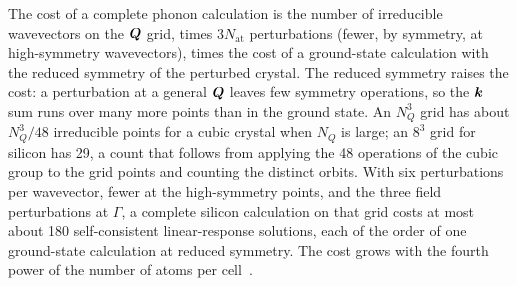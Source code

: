The cost of a complete phonon calculation is the number of irreducible wavevectors on the $\bm{Q}$ grid, times $3N_{\mathrm{at}}$ perturbations (fewer, by symmetry, at high-symmetry wavevectors), times the cost of a ground-state calculation with the reduced symmetry of the perturbed crystal. The reduced symmetry raises the cost: a perturbation at a general $\bm{Q}$ leaves few symmetry operations, so the $\bm{k}$ sum runs over many more points than in the ground state. An $N_Q^3$ grid has about $N_Q^3/48$ irreducible points for a cubic crystal when $N_Q$ is large; an $8^3$ grid for silicon has 29, a count that follows from applying the 48 operations of the cubic group to the grid points and counting the distinct orbits. With six perturbations per wavevector, fewer at the high-symmetry points, and the three field perturbations at $\Gamma$, a complete silicon calculation on that grid costs at most about 180 self-consistent linear-response solutions, each of the order of one ground-state calculation at reduced symmetry. The cost grows with the fourth power of the number of atoms per cell~\cite[Sect.~IV.B]{baroni2001phonons}.

